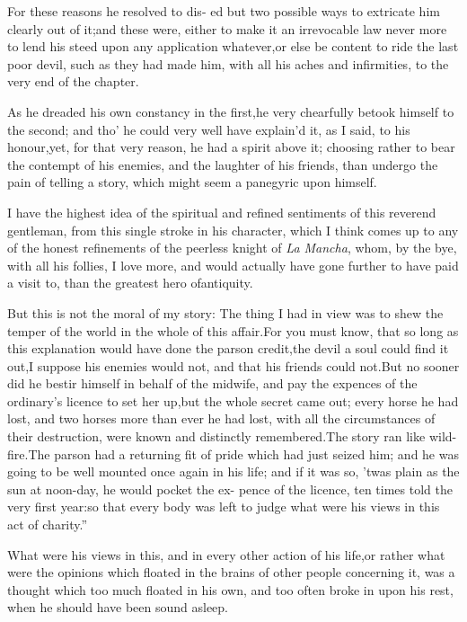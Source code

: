 \documentclass{article}
\begin{document}
For these reasons he resolved to dis-
ed but two possible ways to extricate him clearly out
of it;\tsk  and these were, either to make it an irrevocable law
never more to lend his steed upon any application
whatever,\tsk  or else be content to ride the last poor devil,
such as they had made him, with all his aches and infirmities, to
the very end of the chapter.

As he dreaded his own constancy in the first,\tsk  he very
chearfully betook himself to the second; and tho’ he could very
well have explain’d it, as I said, to his honour,\tsk  yet, for
that very reason, he had a spirit above it; choosing rather to bear
the contempt of his enemies, and the laughter of his friends, than
undergo the pain of telling a story, which might seem a panegyric
upon himself.

I have the highest idea of the spiritual and refined sentiments of this reverend
gentleman, from this single stroke in his character, which I think comes up to any
of the honest refinements of the peerless knight of \textit{La Mancha}, whom, by the
bye, with all his follies, I love more, and would actually have gone further to have
paid a visit to, than the greatest hero of\break antiquity.

But this is not the moral of my story: The thing I had in view
was to shew the temper of the world in the whole of this
affair.\tsk  For you must know, that so long as this explanation
would have done the parson credit,\tsk  the devil a soul could
find it out,\tsk  I suppose his enemies would not, and that his
friends could not.\tsh  But no sooner did he bestir himself in
behalf of the midwife, and pay the expences of the ordinary’s
licence to set her up,\tsk  but the whole secret came out; every
horse he had lost, and two horses more than ever he had lost,
with all the circumstances of their destruction, were known and
distinctly remembered.\tsk  The story ran like wild-fire.\tsk\lqq The parson
had\break
\lqq a returning fit of pride which had just\break
\lqq seized him; and he was going to be\break
\lqq well mounted once again in his life;\break
\lqq and if it was so, ’twas plain as the sun\break
\lqq at noon-day, he would pocket the ex-\break
\lqq pence of the licence, ten times told the\break
\lqq very first year:\tsk  so that every body\break
\lqq was left to judge what were his views\break
\lqq in this act of charity.”

What were his views in this, and in every other action of his
life,\tsk  or rather what were the opinions which floated in the
brains of other people concerning it, was a thought which too much
floated in his own, and too often broke in upon his rest, when he
should have been sound asleep.
\end{document}

